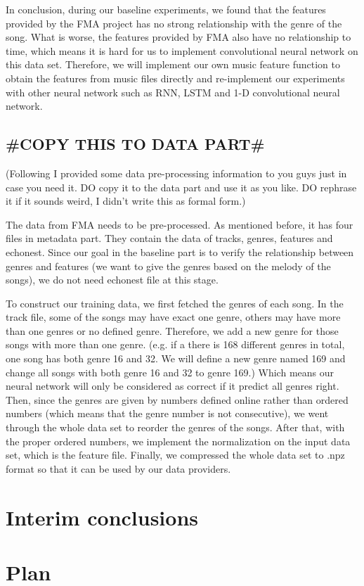 \documentclass{article}
\begin{document}
In conclusion, during our baseline experiments, we found that the features provided by the FMA project has no strong relationship with the genre of the song. What is worse, the features provided by FMA also have no relationship to time, which means it is hard for us to implement convolutional neural network on this data set. Therefore, we will implement our own music feature function to obtain the features from music files directly and re-implement our experiments with other neural network such as RNN, LSTM and 1-D convolutional neural network.

\subsection{\#COPY THIS TO DATA PART\#}
(Following I provided some data pre-processing information to you guys just in case you need it. DO copy it to the data part and use it as you like. DO rephrase it if it sounds weird, I didn't write this as formal form.)

The data from FMA needs to be pre-processed. As mentioned before, it has four files in metadata part. They contain the data of tracks, genres, features and echonest. Since our goal in the baseline part is to verify the relationship between genres and features (we want to give the genres based on the melody of the songs), we do not need echonest file at this stage.

To construct our training data, we first fetched the genres of each song. In the track file, some of the songs may have exact one genre, others may have more than one genres or no defined genre. Therefore, we add a new genre for those songs with more than one genre. (e.g. if a there is 168 different genres in total, one song has both genre 16 and 32. We will define a new genre named 169 and change all songs with both genre 16 and 32 to genre 169.) Which means our neural network will only be considered as correct if it predict all genres right. Then, since the genres are given by numbers defined online rather than ordered numbers (which means that the genre number is not consecutive), we went through the whole data set to reorder the genres of the songs. After that, with the proper ordered numbers, we implement the normalization on the input data set, which is the feature file. Finally, we compressed the whole data set to .npz format so that it can be used by our data providers.

\newpage
\section{Interim conclusions}

\section{Plan}



\end{document}
